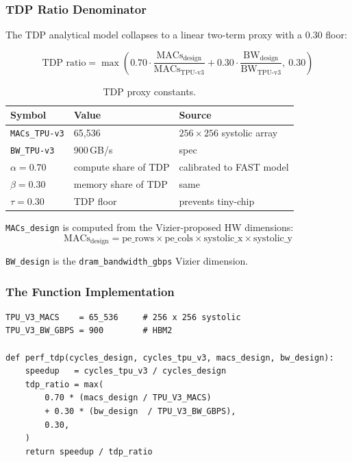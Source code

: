 \documentclass[11pt,a4paper]{article}
\newcommand{\ic}[1]{\texttt{#1}}
\begin{document}
\subsubsection*{TDP Ratio Denominator}

The TDP analytical model collapses to a linear two-term proxy with a 0.30
floor:

\begin{equation}
\text{TDP ratio}
= \max\!\left(
0.70 \cdot \frac{\text{MACs}_{\text{design}}}{\text{MACs}_{\text{TPU-v3}}}
+ 0.30 \cdot \frac{\text{BW}_{\text{design}}}{\text{BW}_{\text{TPU-v3}}},
\ 0.30
\right)
\end{equation}

\begin{table}[h]
\centering
\begin{tabular}{lll}
\toprule
\textbf{Symbol} & \textbf{Value} & \textbf{Source} \\
\midrule
\ic{MACs\_TPU-v3} & 65,536 & $256 \times 256$ systolic array \\
\ic{BW\_TPU-v3}   & 900\,GB/s & spec \\
$\alpha = 0.70$ & compute share of TDP & calibrated to FAST model \\
$\beta  = 0.30$ & memory share of TDP  & same \\
$\tau   = 0.30$ & TDP floor            & prevents tiny-chip \\
\bottomrule
\end{tabular}
\caption{TDP proxy constants.}
\end{table}

\ic{MACs\_design} is computed from the Vizier-proposed HW dimensions:
\begin{equation}
\text{MACs}_{\text{design}}
= \text{pe\_rows} \times \text{pe\_cols} \times \text{systolic\_x} \times \text{systolic\_y}
\end{equation}

\ic{BW\_design} is the \ic{dram\_bandwidth\_gbps} Vizier dimension.

\subsubsection*{The Function Implementation}

\begin{lstlisting}[style=pythonstyle]
TPU_V3_MACS    = 65_536     # 256 x 256 systolic
TPU_V3_BW_GBPS = 900        # HBM2

def perf_tdp(cycles_design, cycles_tpu_v3, macs_design, bw_design):
    speedup   = cycles_tpu_v3 / cycles_design
    tdp_ratio = max(
        0.70 * (macs_design / TPU_V3_MACS)
        + 0.30 * (bw_design  / TPU_V3_BW_GBPS),
        0.30,
    )
    return speedup / tdp_ratio
\end{lstlisting}
\end{document}
